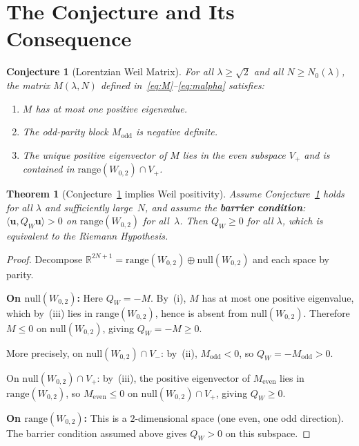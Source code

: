 \documentclass[11pt,a4paper]{article}
\newtheorem{theorem}{Theorem}[section]
\newtheorem{conjecture}{Conjecture}[section]
\begin{document}
\section{The Conjecture and Its Consequence}\label{sec:conjecture}

\begin{conjecture}[Lorentzian Weil Matrix]\label{conj:main}
For all $\lambda \geq \sqrt{2}$ and all $N \geq N_0(\lambda)$, the matrix $M(\lambda, N)$ defined in~\eqref{eq:M}--\eqref{eq:malpha} satisfies:
\begin{enumerate}
\item[\textup{(i)}] $M$ has at most one positive eigenvalue.
\item[\textup{(ii)}] The odd-parity block $M_{\mathrm{odd}}$ is negative definite.
\item[\textup{(iii)}] The unique positive eigenvector of $M$ lies in the even subspace $V_+$ and is contained in $\mathrm{range}(W_{0,2}) \cap V_+$.
\end{enumerate}
\end{conjecture}

\begin{theorem}[Conjecture~\ref{conj:main} implies Weil positivity]\label{thm:implies}
Assume Conjecture~\ref{conj:main} holds for all $\lambda$ and sufficiently large~$N$, and assume the \textbf{barrier condition}: $\langle \mathbf{u}, Q_W \mathbf{u}\rangle > 0$ on $\mathrm{range}(W_{0,2})$ for all~$\lambda$. Then $Q_W \geq 0$ for all $\lambda$, which is equivalent to the Riemann Hypothesis.
\end{theorem}

\begin{proof}
Decompose $\mathbb{R}^{2N+1} = \mathrm{range}(W_{0,2}) \oplus \mathrm{null}(W_{0,2})$ and each space by parity.

\medskip\noindent\textbf{On $\mathrm{null}(W_{0,2})$:} Here $Q_W = -M$. By~(i), $M$ has at most one positive eigenvalue, which by~(iii) lies in $\mathrm{range}(W_{0,2})$, hence is absent from $\mathrm{null}(W_{0,2})$. Therefore $M \leq 0$ on $\mathrm{null}(W_{0,2})$, giving $Q_W = -M \geq 0$.

More precisely, on $\mathrm{null}(W_{0,2}) \cap V_-$: by~(ii), $M_{\mathrm{odd}} < 0$, so $Q_W = -M_{\mathrm{odd}} > 0$.

On $\mathrm{null}(W_{0,2}) \cap V_+$: by~(iii), the positive eigenvector of $M_{\mathrm{even}}$ lies in $\mathrm{range}(W_{0,2})$, so $M_{\mathrm{even}} \leq 0$ on $\mathrm{null}(W_{0,2}) \cap V_+$, giving $Q_W \geq 0$.

\medskip\noindent\textbf{On $\mathrm{range}(W_{0,2})$:} This is a $2$-dimensional space (one even, one odd direction). The barrier condition assumed above gives $Q_W > 0$ on this subspace.
\end{proof}
\end{document}
